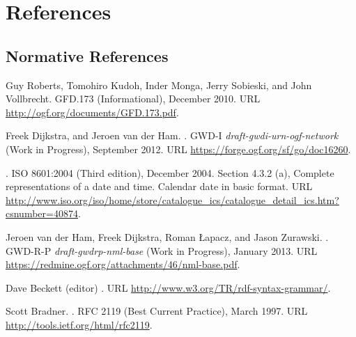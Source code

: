 %
\section*{References}%
\label{s:references}
% 
\renewcommand{\refname}{}

\subsection*{Normative References}
\begin{thebibliography}{10}
\vspace*{-3em}
Guy Roberts, Tomohiro Kudoh, Inder Monga, Jerry Sobieski, and John Vollbrecht.
\newblock GFD.173 (Informational), December 2010.
\newblock URL \url{http://ogf.org/documents/GFD.173.pdf}.

Freek Dijkstra, and Jeroen van der Ham.
.
\newblock GWD-I \emph{draft-gwdi-urn-ogf-network} (Work in Progress), September 2012.
\newblock URL \url{https://forge.ogf.org/sf/go/doc16260}.

.
\newblock ISO 8601:2004 (Third edition), December 2004.
\newblock Section 4.3.2 (a), Complete representations of a date and time. Calendar date in basic format.
\newblock URL \url{http://www.iso.org/iso/home/store/catalogue_ics/catalogue_detail_ics.htm?csnumber=40874}.

Jeroen van der Ham, Freek Dijkstra, Roman Łapacz, and Jason Zurawski.
.
\newblock GWD-R-P \emph{draft-gwdrp-nml-base} (Work in Progress), January 2013.
\newblock URL \url{https://redmine.ogf.org/attachments/46/nml-base.pdf}.

Dave Beckett (editor)
.
\newblock URL \url{http://www.w3.org/TR/rdf-syntax-grammar/}.

Scott Bradner.
.
\newblock RFC 2119 (Best Current Practice), March 1997.
\newblock URL \url{http://tools.ietf.org/html/rfc2119}.


\end{thebibliography}
